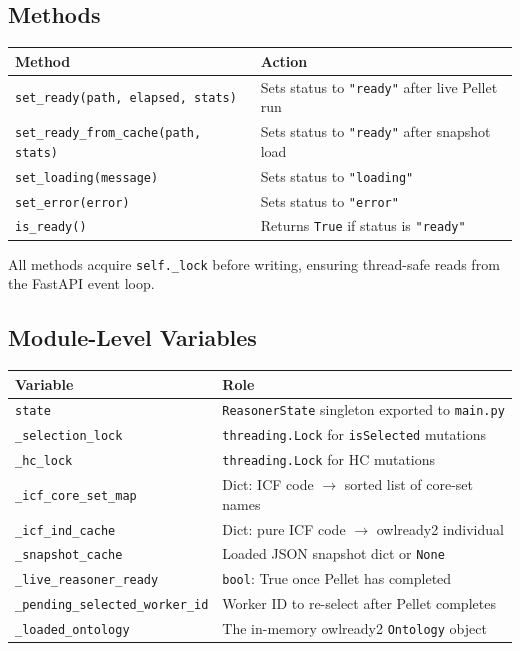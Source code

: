 ﻿\documentclass[12pt,a4paper]{article}
\begin{document}
\subsection{Methods}

\begin{longtable}{@{}P{5cm}P{9.5cm}@{}}
\toprule
\textbf{Method} & \textbf{Action} \\
\midrule
\endhead
\texttt{set\_ready(path, elapsed, stats)} & Sets status to \texttt{"ready"} after live Pellet run \\
\texttt{set\_ready\_from\_cache(path, stats)} & Sets status to \texttt{"ready"} after snapshot load \\
\texttt{set\_loading(message)} & Sets status to \texttt{"loading"} \\
\texttt{set\_error(error)} & Sets status to \texttt{"error"} \\
\texttt{is\_ready()} & Returns \texttt{True} if status is \texttt{"ready"} \\
\bottomrule
\end{longtable}

All methods acquire \texttt{self.\_lock} before writing, ensuring thread-safe reads from the FastAPI event loop.

\subsection{Module-Level Variables}

\begin{longtable}{@{}P{5cm}P{9.5cm}@{}}
\toprule
\textbf{Variable} & \textbf{Role} \\
\midrule
\endhead
\texttt{state} & \texttt{ReasonerState} singleton exported to \texttt{main.py} \\
\texttt{\_selection\_lock} & \texttt{threading.Lock} for \texttt{isSelected} mutations \\
\texttt{\_hc\_lock} & \texttt{threading.Lock} for HC mutations \\
\texttt{\_icf\_core\_set\_map} & Dict: ICF code $\to$ sorted list of core-set names \\
\texttt{\_icf\_ind\_cache} & Dict: pure ICF code $\to$ owlready2 individual \\
\texttt{\_snapshot\_cache} & Loaded JSON snapshot dict or \texttt{None} \\
\texttt{\_live\_reasoner\_ready} & \texttt{bool}: True once Pellet has completed \\
\texttt{\_pending\_selected\_worker\_id} & Worker ID to re-select after Pellet completes \\
\texttt{\_loaded\_ontology} & The in-memory owlready2 \texttt{Ontology} object \\
\bottomrule
\end{longtable}
\end{document}
